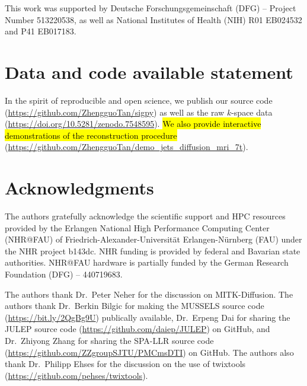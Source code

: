 \documentclass[preprint,12pt,authoryear,review]{elsarticle}
\begin{document}
    This work was supported by Deutsche Forschungsgemeinschaft (DFG) -- Project Number 513220538,
    as well as National Institutes of Health (NIH) R01 EB024532 and P41 EB017183.

    \section*{Data and code available statement}

    In the spirit of reproducible and open science,
    we publish our source code
    (\url{https://github.com/ZhengguoTan/sigpy})
    as well as the raw $k$-space data
    (\url{https://doi.org/10.5281/zenodo.7548595}).
    \hl{We also provide interactive demonstrations
    of the reconstruction procedure}
    (\url{https://github.com/ZhengguoTan/demo_jets_diffusion_mri_7t}).

    \section*{Acknowledgments}
        The authors gratefully acknowledge the scientific support and HPC resources
        provided by the Erlangen National High Performance Computing Center (NHR@FAU)
        of Friedrich-Alexander-Universit\"at Erlangen-N\"urnberg (FAU)
        under the NHR project b143dc.
        NHR funding is provided by federal and Bavarian state authorities.
        NHR@FAU hardware is partially funded by the German Research Foundation (DFG) -- 440719683.

        The authors thank Dr.~Peter Neher for the discussion on MITK-Diffusion.
        The authors thank
        Dr.~Berkin Bilgic for making the MUSSELS source code
        (\url{https://bit.ly/2QgBg9U}) publically available,
        Dr.~Erpeng Dai for sharing the JULEP source code
        (\url{https://github.com/daiep/JULEP}) on GitHub,
        and Dr.~Zhiyong Zhang for sharing the SPA-LLR source code
        (\url{https://github.com/ZZgroupSJTU/PMCmsDTI}) on GitHub.
        The authors also thank Dr.~Philipp Ehses for the discussion on
        the use of twixtools (\url{https://github.com/pehses/twixtools}).




    
\end{document}
